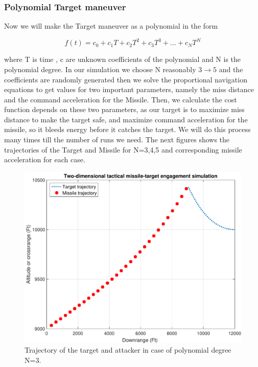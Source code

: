 \subsubsection{Polynomial Target maneuver}
Now we will make the Target maneuver as a polynomial in the form

\begin{equation}
	f(t) = c_0 + c_1 T + c_2 T^2 + c_3 T^3 + ... + c_N T^N
\end{equation} 

where T is time , c are unknown coefficients of the polynomial and N is the polynomial degree.
In our simulation we choose N reasonably $3\to5$ and the coefficients are randomly generated then we solve the proportional navigation equations to get values for two important parameters, namely the miss distance and the command acceleration for the Missile. Then, we calculate the cost function depends on these two parameters, as our target is to maximize miss distance to make the target safe, and maximize command acceleration for the missile, so it bleeds energy before it catches the target. We will do this process many times till the number of runs we need. The next figures shows the trajectories of the Target and Missile for N=3,4,5 and corresponding missile acceleration for each case.

\begin{figure}[htb]
	\centering
	\includegraphics[scale = 0.75]{fig/trajectoryP3.pdf}
	\caption{Trajectory of the target and attacker in case of polynomial degree N=3.}
	\label{trajectoryP3}
\end{figure}


